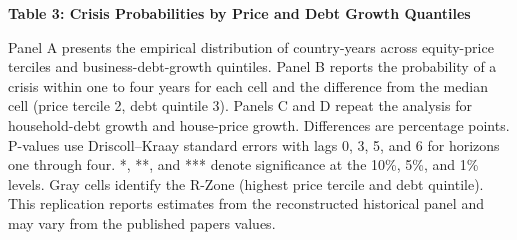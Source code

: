 \documentclass[11pt]{article}
\begin{document}
\noindent\textbf{Table 3: Crisis Probabilities by Price and Debt Growth Quantiles}

\smallskip
\noindent\footnotesize
Panel A presents the empirical distribution of country-years across equity-price
terciles and business-debt-growth quintiles. Panel B reports the probability of a
crisis within one to four years for each cell and the difference from the median
cell (price tercile 2, debt quintile 3). Panels C and D repeat the analysis for
household-debt growth and house-price growth. Differences are percentage points.
P-values use Driscoll--Kraay standard errors with lags 0, 3, 5, and 6 for horizons
one through four. *, **, and *** denote significance at the 10\%, 5\%, and 1\%
levels. Gray cells identify the R-Zone (highest price tercile and debt quintile).
This replication reports estimates from the reconstructed historical panel and 
may vary from the published papers values.

\normalsize
\medskip

\end{document}
